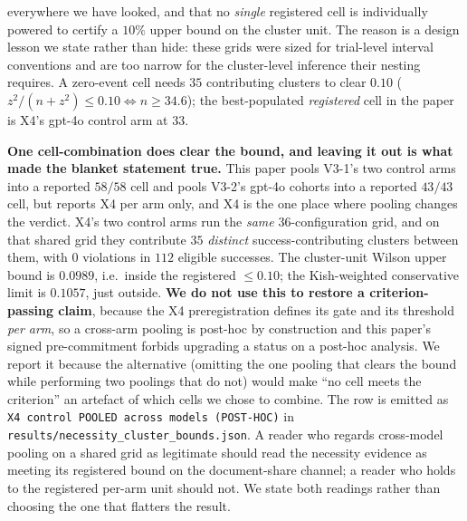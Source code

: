 \documentclass{article}
\begin{document}
everywhere we have looked, and that no \emph{single} registered cell is individually powered to certify a $10\%$ upper bound on the cluster unit. The reason is a design lesson we state rather than hide: these grids were sized for trial-level interval conventions and are too narrow for the cluster-level inference their nesting requires. A zero-event cell needs $35$ contributing clusters to clear $0.10$ ($z^2/(n+z^2) \leq 0.10 \Leftrightarrow n \geq 34.6$); the best-populated \emph{registered} cell in the paper is X4's gpt-4o control arm at $33$.

\noindent \textbf{One cell-combination does clear the bound, and leaving it out is what made the blanket statement true.} This paper pools V3-1's two control arms into a reported $58/58$ cell and pools V3-2's gpt-4o cohorts into a reported $43/43$ cell, but reports X4 per arm only, and X4 is the one place where pooling changes the verdict. X4's two control arms run the \emph{same} 36-configuration grid, and on that shared grid they contribute $35$ \emph{distinct} success-contributing clusters between them, with $0$ violations in $112$ eligible successes. The cluster-unit Wilson upper bound is $\mathbf{0.0989}$, i.e.\ inside the registered $\leq 0.10$; the Kish-weighted conservative limit is $0.1057$, just outside. \textbf{We do not use this to restore a criterion-passing claim}, because the X4 preregistration defines its gate and its threshold \emph{per arm}, so a cross-arm pooling is post-hoc by construction and this paper's signed pre-commitment forbids upgrading a status on a post-hoc analysis. We report it because the alternative (omitting the one pooling that clears the bound while performing two poolings that do not) would make ``no cell meets the criterion'' an artefact of which cells we chose to combine. The row is emitted as \texttt{X4 control POOLED across models (POST-HOC)} in \texttt{results/necessity\_cluster\_bounds.json}. A reader who regards cross-model pooling on a shared grid as legitimate should read the necessity evidence as meeting its registered bound on the document-share channel; a reader who holds to the registered per-arm unit should not. We state both readings rather than choosing the one that flatters the result.
\end{document}
